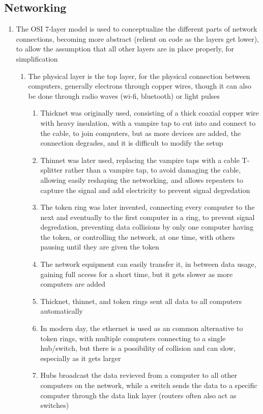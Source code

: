 \documentclass[11 pt, twoside]{article}
\begin{document}
\begin{enumerate}
\subsection{Networking}
\begin{enumerate}
\item The OSI 7-layer model is used to conceptualize the different parts of network connections, becoming more abstract (relient on code as the layers get lower), to allow the assumption that all other layers are in place properly, for simplification
\begin{enumerate}
\item The physical layer is the top layer, for the physical connection between computers, generally electrons through copper wires, though it can also be done through radio waves (wi-fi, bluetooth) or light pulses
\begin{enumerate}
\item Thicknet was originally used, consisting of a thick coaxial copper wire with heavy insulation, with a vampire tap to cut into and connect to the cable, to join computers, but as more devices are added, the connection degrades, and it is difficult to modify the setup
\item Thinnet was later used, replacing the vampire taps with a cable T-splitter rather than a vampire tap, to avoid damaging the cable, allowing easily reshaping the networking, and allows repeaters to capture the signal and add electricity to prevent signal degredation
\item The token ring was later invented, connecting every computer to the next and eventually to the first computer in a ring, to prevent signal degredation, preventing data collisions by only one computer having the token, or controlling the network, at one time, with others pausing until they are given the token
\item The network equipment can easily transfer it, in between data usage, gaining full access for a short time, but it gets slower as more computers are added
\item Thicknet, thinnet, and token rings sent all data to all computers automatically
\item In modern day, the ethernet is used as an common alternative to token rings, with multiple computers connecting to a single hub/switch, but there is a possibility of collision and can slow, especially as it gets larger
\item Hubs broadcast the data revieved from a computer to all other computers on the network, while a switch sends the data to a specific computer through the data link layer (routers often also act as switches)

\end{enumerate}
\end{enumerate}
\end{enumerate}
\end{enumerate}
\end{document}
